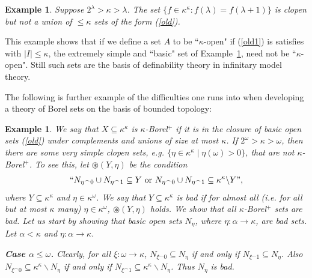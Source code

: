 \documentclass[12pt,a4paper]{amsart}
\newtheorem{example}[thm]{Example}
\theoremstyle{definition}
\theoremstyle{remark}
\renewcommand{\mid}{\mathrel{|}\allowbreak}
\begin{document}
\begin{example}\label{example11}
Suppose $2^\lambda>\kappa>\lambda$. The set $\{f\in\kappa^\kappa:f(\lambda)=f(\lambda+1)\}$ is clopen but not a union of $\le\kappa$ sets of the form (\ref{old}).
\end{example}

This example shows that if we define  a set $A$ to be ``$\kappa$-open" if (\ref{old1}) is satisfies with $|I|\le\kappa$, the extremely simple and ``basic" set of  Example~\ref{example11}, need not be ``$\kappa$-open". Still such sets are the basis of definability theory in infinitary model theory. 

The following is further example of the difficulties one runs into when developing a theory of Borel sets on the basis of bounded topology:

\begin{example}\label{example1}
We say that $X\subseteq \kappa^\kappa$ is $\kappa$-Borel\hspace{2pt}$^+$ if it is in the closure of basic open sets (\ref{old}) under complements and unions of size at most $\kappa$. If $2^\omega>\kappa>\omega$, then there are some very simple clopen sets, e.g. $\{\eta\in\kappa^\kappa\mid 
\eta(\omega)>0\}$, that are not $\kappa$-Borel\hspace{2pt}$^+$\!. 
%
To see this, let $\circledast(Y,\eta)$ be the condition $$``N_{\eta^\frown 0}\cup N_{\eta^\frown 1}\subseteq Y\text{ or }N_{\eta^\frown 0}\cup N_{\eta^\frown 1}\subseteq \kappa^\kappa\backslash Y",$$ where $Y\subseteq\kappa^\kappa$ and $\eta\in \kappa^\omega$.
We say that $Y\subseteq \kappa^\kappa$ is \emph{bad} if for almost all (i.e. for all but at most $\kappa$ many) $\eta\in\kappa^\omega$, $\circledast(Y,\eta)$ holds.
We show that all $\kappa$-Borel\hspace{2pt}$^+$ sets are bad.
    Let us start by showing that basic open sets $N_\eta$, where $\eta:\alpha\rightarrow \kappa$, are bad sets. Let $\alpha<\kappa$ and $\eta:\alpha\rightarrow \kappa$. 
  
         {\bf Case $\alpha\leq\omega$.} Clearly, for all $\xi:\omega\rightarrow\kappa$, $N_{\xi^\frown 0}\subseteq N_\eta$ if and only if $N_{\xi^\frown 1}\subseteq N_\eta$. Also $N_{\xi^\frown 0}\subseteq \kappa^\kappa\backslash N_\eta$ if and only if $N_{\xi^\frown 1}\subseteq \kappa^\kappa\backslash N_\eta$. Thus $N_\eta$ is bad.
         

\end{example}
\end{document}
